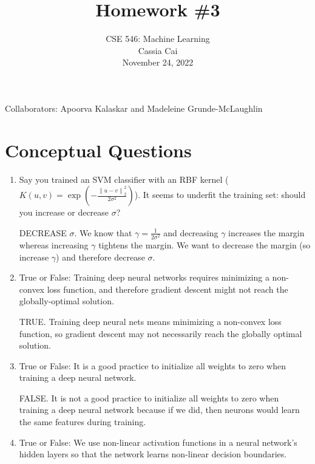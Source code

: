 \documentclass{article}
\begin{document}
\setcounter{aprob}{0}
\title{Homework \#3}
\author{
    \normalsize{CSE 546: Machine Learning}\\
    \normalsize{Cassia Cai}\\
    \normalsize{November 24, 2022}\\
}
\date{{}}
\maketitle

Collaborators: Apoorva Kalaskar and Madeleine Grunde-McLaughlin

\section*{Conceptual Questions}

\begin{aprob}
    \begin{enumerate}
        \item {} Say you trained an SVM classifier with an RBF kernel ($K(u, v) = \exp\left(-\frac{\left\|u-v\right\|^2_2}{2\sigma^2}\right)$). It seems to underfit the training set: should you increase or decrease $\sigma$?
        
        DECREASE $\sigma$. We know that $\gamma = \frac{1}{2\sigma^2}$ and decreasing $\gamma$ increases the margin whereas increasing $\gamma$ tightens the margin. We want to decrease the margin (so increase $\gamma$) and therefore decrease $\sigma$. 
        
        \item {} True or False:   Training deep neural networks requires minimizing a non-convex loss function, and therefore gradient descent might not reach the globally-optimal solution.
        
        TRUE. Training deep neural nets means minimizing a non-convex loss function, so gradient descent may not necessarily reach the globally optimal solution.
        
        \item {} True or False: It is a good practice to initialize all weights to zero when training a deep neural network.
        
        FALSE. It is not a good practice to initialize all weights to zero when training a deep neural network because if we did, then neurons would learn the same features during training.
        
        \item {} True or False:   We use non-linear activation functions in a neural network’s hidden layers so that the network learns non-linear decision boundaries.
        

\end{enumerate}
\end{aprob}
\end{document}
